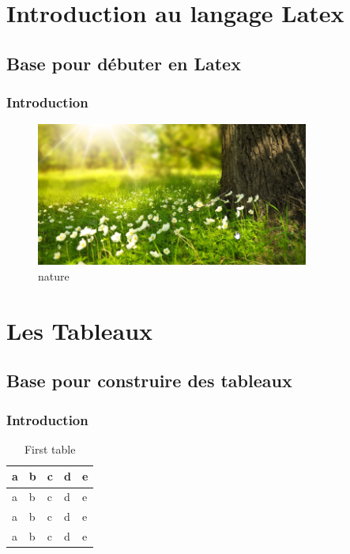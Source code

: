 \documentclass{report}
\begin{document}
\tableofcontents
\part{Introduction au langage Latex}
\chapter{Base pour débuter en Latex}
\section{Introduction}
\lipsum[1-2]
\begin{figure}
    \centering
    \includegraphics[width=0.8\textwidth]{nature.png}
    \caption{nature}
\end{figure}

\part{Les Tableaux}
\chapter{Base pour construire des tableaux}
\section{Introduction}
\lipsum[1-2]
\begin{table}
    \centering
    \begin{tabular}{|l|l|l|l|l|}
        \hline
        a & b & c & d & e \\
        \hline
        a & b & c & d & e \\
        \hline
        a & b & c & d & e \\
        \hline
        a & b & c & d & e \\
        \hline
    \end{tabular}
    \caption{First table}
\end{table}
\end{document}
